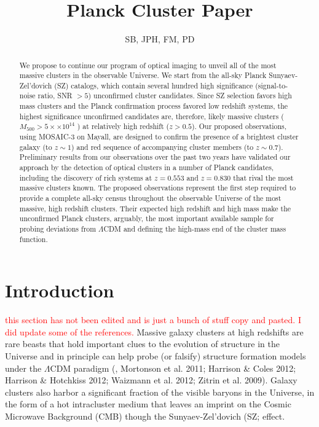 \documentclass[apj, revtex4]{emulateapj}
\newcommand{\editorial}[1]{\textcolor{red}{#1}}
\begin{document}
	
\title{Planck Cluster Paper}
	
\author{\sc SB, JPH, FM, PD} 
	


\begin{abstract}
	\noindent We propose to continue our program of optical imaging to unveil all of the most massive clusters in
	the observable Universe. We start from the all-sky Planck Sunyaev-Zel’dovich (SZ) catalogs, which contain several hundred high significance (signal-to-noise ratio, SNR $> 5$) unconfirmed cluster candidates. Since SZ selection favors high mass clusters and the Planck confirmation process favored	low redshift systems, the highest significance unconfirmed candidates are, therefore, likely massive clusters ($M_{500} > 5 ×\times 10^{14}$ \Msol) at relatively high redshift ($z > 0.5$). Our proposed observations,	using MOSAIC-3 on Mayall, are designed to confirm the presence of a brightest cluster galaxy (to $z \sim 1$) and red sequence of accompanying cluster members (to $z \sim 0.7$). Preliminary results from our observations over the past two years have validated our approach by the detection of optical clusters in a number of Planck candidates, including the discovery of rich systems at $z = 0.553$ and $z = 0.830$ that rival the most massive clusters known. The proposed observations represent the first step required to provide a complete all-sky census throughout the observable Universe of the most massive, high redshift clusters. Their expected high redshift and high mass make the unconfirmed Planck clusters, arguably, the most important available sample for probing deviations from $\Lambda$CDM and defining the high-mass end of the cluster mass function.
\end{abstract}

\section{Introduction}
\editorial{this section has not been edited and is just a bunch of stuff copy and pasted. I did update some of the references.}
Massive galaxy clusters at high redshifts are rare beasts that hold important clues to the evolution of structure in the Universe and in principle can help probe (or falsify) structure formation models under the $\Lambda$CDM paradigm (\eg, Mortonson et al. 2011; Harrison \& Coles 2012; Harrison \& Hotchkiss 2012; Waizmann et al. 2012; Zitrin et al. 2009). Galaxy clusters also harbor a significant fraction of the visible baryons in the Universe, in the form of a hot intracluster medium that leaves an imprint on the Cosmic Microwave Background (CMB) though the Sunyaev-Zel'dovich (SZ; \citealt{Sunyaev1972} effect. 
\end{document}
